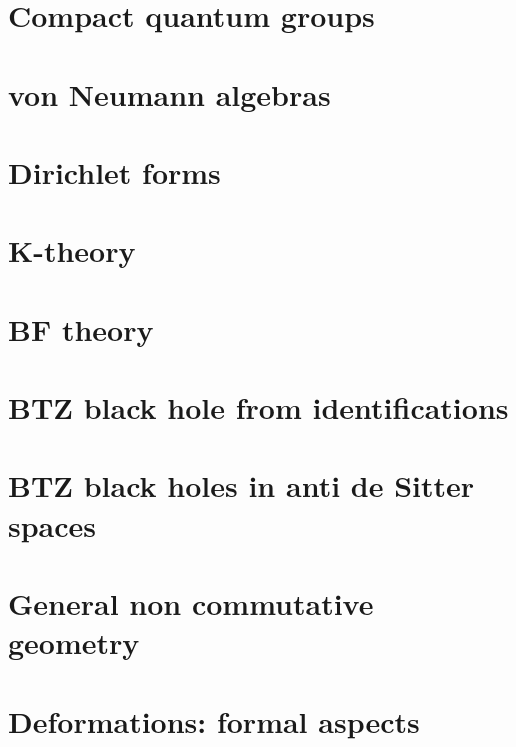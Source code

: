 \documentclass[a4paper,twoside,11pt]{book}
\begin{document}
\chapter{Compact quantum groups}


\chapter{von Neumann algebras}





\chapter{Dirichlet forms}


\chapter{K-theory}


\chapter{BF theory}


\chapter{BTZ black hole from identifications}




\chapter{BTZ black holes in anti de Sitter spaces}                  \label{ChapBHinAdS}
%
%










\chapter{General non commutative geometry}




\chapter{Deformations: formal aspects}          \label{ChapDefo}

\end{document}
